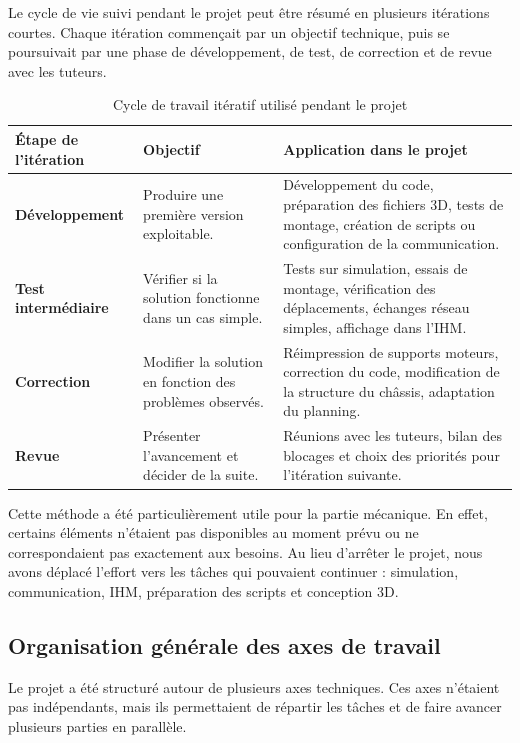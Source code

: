 \documentclass[11pt,a4paper]{report}
\begin{document}
Le cycle de vie suivi pendant le projet peut être résumé en plusieurs itérations courtes. Chaque itération commençait par un objectif technique, puis se poursuivait par une phase de développement, de test, de correction et de revue avec les tuteurs.

\begin{table}[H]
\centering
\small
\renewcommand{\arraystretch}{1.25}
\begin{tabular}{|p{3.8cm}|p{5.3cm}|p{5.3cm}|}
\hline
\textbf{Étape de l'itération} & \textbf{Objectif} & \textbf{Application dans le projet} \\
\hline

\textbf{Développement} &
Produire une première version exploitable. &
Développement du code, préparation des fichiers 3D, tests de montage, création de scripts ou configuration de la communication. \\
\hline
\textbf{Test intermédiaire} &
Vérifier si la solution fonctionne dans un cas simple. &
Tests sur simulation, essais de montage, vérification des déplacements, échanges réseau simples, affichage dans l'IHM. \\
\hline
\textbf{Correction} &
Modifier la solution en fonction des problèmes observés. &
Réimpression de supports moteurs, correction du code, modification de la structure du châssis, adaptation du planning. \\
\hline
\textbf{Revue} &
Présenter l'avancement et décider de la suite. &
Réunions avec les tuteurs, bilan des blocages et choix des priorités pour l'itération suivante. \\
\hline
\end{tabular}
\caption{Cycle de travail itératif utilisé pendant le projet}
\label{tab:cycle_iteratif}
\end{table}

Cette méthode a été particulièrement utile pour la partie mécanique. En effet, certains éléments n'étaient pas disponibles au moment prévu ou ne correspondaient pas exactement aux besoins. Au lieu d'arrêter le projet, nous avons déplacé l'effort vers les tâches qui pouvaient continuer : simulation, communication, IHM, préparation des scripts et conception 3D.

\subsection{Organisation générale des axes de travail}

Le projet a été structuré autour de plusieurs axes techniques. Ces axes n'étaient pas indépendants, mais ils permettaient de répartir les tâches et de faire avancer plusieurs parties en parallèle.
\end{document}
